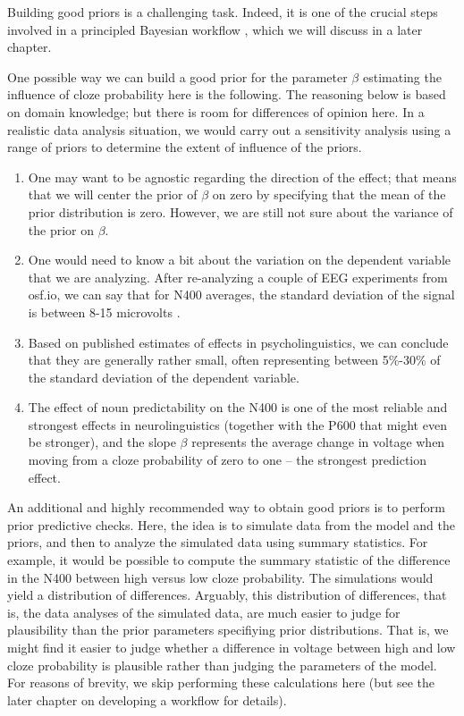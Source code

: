 \documentclass[12pt,]{krantz}
\providecommand{\tightlist}{%
  \setlength{\itemsep}{0pt}\setlength{\parskip}{0pt}}
\theoremstyle{definition}
\theoremstyle{definition}
\theoremstyle{definition}
\theoremstyle{remark}
\begin{document}
Building good priors is a challenging task. Indeed, it is one of the crucial steps involved in a principled Bayesian workflow \citep{schad2020toward}, which we will discuss in a later chapter.

One possible way we can build a good prior for the parameter \(\beta\) estimating the influence of cloze probability here is the following. The reasoning below is based on domain knowledge; but there is room for differences of opinion here. In a realistic data analysis situation, we would carry out a sensitivity analysis using a range of priors to determine the extent of influence of the priors.

\begin{enumerate}
\def\labelenumi{\arabic{enumi}.}
\tightlist
\item
  One may want to be agnostic regarding the direction of the effect; that means that we will center the prior of \(\beta\) on zero by specifying that the mean of the prior distribution is zero. However, we are still not sure about the variance of the prior on \(\beta\).
\item
  One would need to know a bit about the variation on the dependent variable that we are analyzing. After re-analyzing a couple of EEG experiments from osf.io, we can say that for N400 averages, the standard deviation of the signal is between 8-15 microvolts \citep{nicenboim2020words}.
\item
  Based on published estimates of effects in psycholinguistics, we can conclude that they are generally rather small, often representing between 5\%-30\% of the standard deviation of the dependent variable.
\item
  The effect of noun predictability on the N400 is one of the most reliable and strongest effects in neurolinguistics (together with the P600 that might even be stronger), and the slope \(\beta\) represents the average change in voltage when moving from a cloze probability of zero to one -- the strongest prediction effect.
\end{enumerate}

An additional and highly recommended way to obtain good priors \citep[also see the chapter on a principled Bayesian workflow]{schad2020toward} is to perform prior predictive checks. Here, the idea is to simulate data from the model and the priors, and then to analyze the simulated data using summary statistics. For example, it would be possible to compute the summary statistic of the difference in the N400 between high versus low cloze probability. The simulations would yield a distribution of differences. Arguably, this distribution of differences, that is, the data analyses of the simulated data, are much easier to judge for plausibility than the prior parameters specifiying prior distributions. That is, we might find it easier to judge whether a difference in voltage between high and low cloze probability is plausible rather than judging the parameters of the model. For reasons of brevity, we skip performing these calculations here (but see the later chapter on developing a workflow for details).
\end{document}
